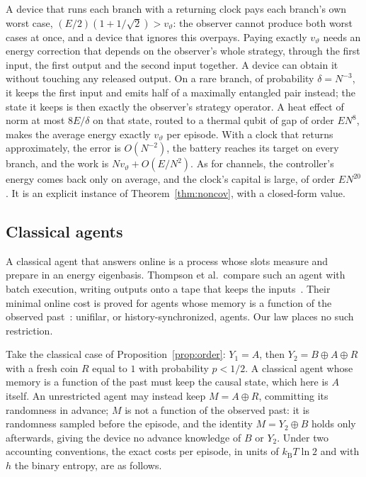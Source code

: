 \documentclass[11pt]{article}
\theoremstyle{definition}
\theoremstyle{remark}
\newcommand{\kB}{k_{\mathrm B}}
\begin{document}
A device that runs each branch with a returning clock pays each branch's own worst case, $(E/2)(1+1/\sqrt2)>v_\vartheta$: the observer cannot produce both worst cases at once, and a device that ignores this overpays. Paying exactly $v_\vartheta$ needs an energy correction that depends on the observer's whole strategy, through the first input, the first output and the second input together. A device can obtain it without touching any released output. On a rare branch, of probability $\delta=N^{-3}$, it keeps the first input and emits half of a maximally entangled pair instead; the state it keeps is then exactly the observer's strategy operator. A heat effect of norm at most $8E/\delta$ on that state, routed to a thermal qubit of gap of order $EN^8$, makes the average energy exactly $v_\vartheta$ per episode. With a clock that returns approximately, the error is $O(N^{-2})$, the battery reaches its target on every branch, and the work is $Nv_\vartheta+O(E/N^2)$. As for channels, the controller's energy comes back only on average, and the clock's capital is large, of order $EN^{20}$. It is an explicit instance of Theorem~\ref{thm:noncov}, with a closed-form value.

\subsection{Classical agents}

A classical agent that answers online is a process whose slots measure and prepare in an energy eigenbasis. Thompson et al.\ compare such an agent with batch execution, writing outputs onto a tape that keeps the inputs~\cite{Thompson25}. Their minimal online cost is proved for agents whose memory is a function of the observed past~\cite{Thompson25}: unifilar, or history-synchronized, agents. Our law places no such restriction.

Take the classical case of Proposition~\ref{prop:order}: $Y_1=A$, then $Y_2=B\oplus A\oplus R$ with a fresh coin $R$ equal to $1$ with probability $p<1/2$. A classical agent whose memory is a function of the past must keep the causal state, which here is $A$ itself. An unrestricted agent may instead keep $M=A\oplus R$, committing its randomness in advance; $M$ is not a function of the observed past: it is randomness sampled before the episode, and the identity $M=Y_2\oplus B$ holds only afterwards, giving the device no advance knowledge of $B$ or $Y_2$. Under two accounting conventions, the exact costs per episode, in units of $\kB T\ln2$ and with $h$ the binary entropy, are as follows.
\end{document}
